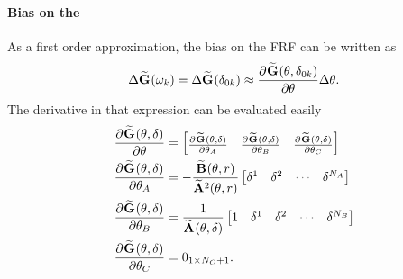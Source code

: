 \paragraph{Bias on the }
As a first order approximation, the bias on the \gls{FRF} can be written as
\begin{equation}
  \Delta \mathbf{\widetilde{G}}_{} (\omega_k) 
  =
  \Delta \mathbf{\widetilde{G}}_{} (\delta_{0k}) 
     \approx 
        \frac{{\partial}^{} \mathbf{\widetilde{G}}_{} (\theta, \delta_{0k})}{\partial \theta} 
      \Delta \theta
      \text{.}
\end{equation}
The derivative in that expression can be evaluated easily
\begin{align}
    \PartialDerivative{\LocalModel{G}(\theta, \dW)}{\theta} 
     &=
     \begin{bmatrix}
       \PartialDerivative{\LocalModel{G}(\theta,\dW)}{\theta_A} &
       \PartialDerivative{\LocalModel{G}(\theta,\dW)}{\theta_B} &
       \PartialDerivative{\LocalModel{G}(\theta,\dW)}{\theta_C} 
     \end{bmatrix}
     \\
     \PartialDerivative{\LocalModel{G}(\theta, \dW)}{\theta_A} 
     &=
     - \frac{\LocalModel{B}(\theta, r)}{\LocalModel{A}^2(\theta, r)}
     \begin{bmatrix}
         \dW^1 & \dW^2 & \deemph{\cdots} & \dW^{\order{A}}
     \end{bmatrix}
     \\
     \PartialDerivative{\LocalModel{G}(\theta, \dW)}{\theta_B} 
     &=
     \frac{1}{\LocalModel{A}(\theta, \dW)}
     \begin{bmatrix}
         1 & \dW^1 & \dW^2 & \deemph{\cdots} & \dW^{\order{B}}
     \end{bmatrix}
     \\
     \PartialDerivative{\LocalModel{G}(\theta, \dW)}{\theta_C} 
     &=
     \Zero{1 \times \order{C}+1}
     \text{.}
\end{align}

